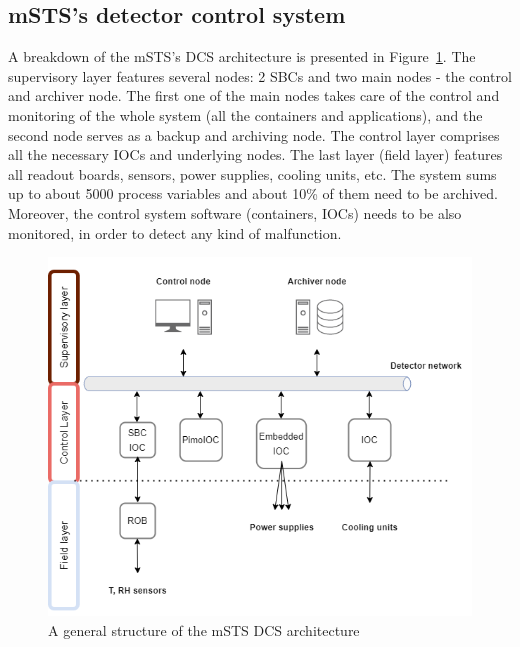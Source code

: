 \subsection{mSTS's detector control system}
A breakdown of the \gls{mSTS}'s \gls{DCS} architecture is presented in Figure~\ref{fig_mstsarch}. The supervisory layer features several nodes: 2 \gls{SBC}s and two main nodes - the control and archiver node. The first one of the main nodes takes care of the control and monitoring of the whole system (all the containers and applications), and the second node serves as a backup and archiving node. The control layer comprises all the necessary \gls{IOC}s and underlying nodes. The last layer (field layer) features all readout boards, sensors, power supplies, cooling units, etc. The system sums up to about 5000 process variables and about 10\% of them need to be archived. Moreover, the control system software (containers, \gls{IOC}s) needs to be also monitored, in order to detect any kind of malfunction. 

\begin{figure}[!h]
\centering
\includegraphics[width=0.55\columnwidth]{Chapter5/DCS/images/mcbmpng.png}
\caption{A general structure of the \gls{mSTS} DCS architecture}
\label{fig_mstsarch}
\end{figure}

